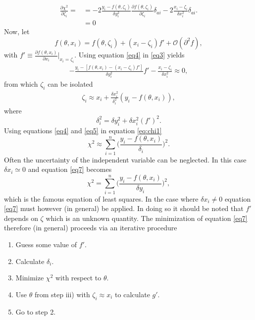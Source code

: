 \begin{example}
	\begin{equation}
		\begin{split}
			\frac{\partial \chi^2}{\partial \zeta_i}= &=-2\frac{y_i-f(\theta,\zeta_i)}{\delta y_i^2}\frac{\partial f(\theta,\zeta_i)}{\partial \zeta_i}\delta_{ai}-2\frac{x_i-\zeta_i}{\delta x_i^2}\delta_{ai}.\\
			&=0
		\end{split}
		\label{eq3}
	\end{equation}
	Now, let
	\begin{equation}
		f(\theta,x_i)=f(\theta,\zeta_i)+(x_i-\zeta_i)f'+\mathcal{O}(\partial^2f),
		\label{eq4}
	\end{equation}
	with $f' \equiv \frac{\partial f(\theta,x_i)}{\partial x_i}\big|_{x_i=\zeta_i}$. Using equation \eqref{eq4} in \eqref{eq3} yields
	\begin{equation}
		\begin{split}
			-\frac{y_i-[f(\theta,x_i)-(x_i-\zeta_i)f']}{\delta y_i^2}f'-\frac{x_i-\zeta_i}{\delta x_i^2}\approx 0,
		\end{split}
	\end{equation}
	from which $\zeta_i$ can be isolated
	\begin{equation}
		\begin{split}
			\zeta_i\approx x_i+\frac{\delta x_i^2}{\delta_i^2}(y_i-f(\theta,x_i)),
		\end{split}
		\label{eq5}
	\end{equation}
	where
	\begin{equation}
		\delta_i^2=\delta y_i^2+\delta x_i^2(f')^2.
		\label{eq:d1}
	\end{equation}
	Using equations \eqref{eq4} and \eqref{eq5} in equation \eqref{eq:chi1}
	\begin{equation}
		\chi^2\approx\sum_{i=1}^n\bigg(\frac{y_i-f(\theta,x_i)}{\delta_i}\bigg)^2.
		\label{eq7}
	\end{equation}
	Often the uncertainty of the independent variable can be neglected. In this case $\delta x_i\simeq 0$ and equation \eqref{eq7} becomes
	\begin{equation}
		\chi^2 =\sum_{i=1}^n\bigg(\frac{y_i-f(\theta,x_i)}{\delta y_i}\bigg)^2,
		\label{eq8}
	\end{equation}
	which is the famous equation of least squares. In the case where $\delta x_i\neq 0$ equation \eqref{eq7} must however (in general) be applied. In doing so it should be noted that $f'$ depends on $\zeta$ which is an unknown quantity. The minimization of equation \eqref{eq7} therefore (in general) proceeds via an iterative procedure
	\begin{enumerate}
		\item Guess some value of $f'$.
		\item Calculate $\delta_i$.
		\item Minimize $\chi^2$ with respect to $\theta$.
		\item Use $\theta$ from step iii) with $\zeta_i\approx x_i$ to calculate $g'$.
		\item Go to step 2.\newline
	\end{enumerate}
\end{example}

